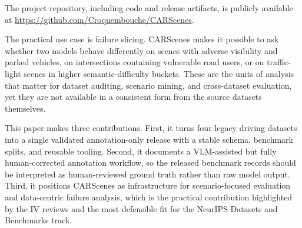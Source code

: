 The project repository, including code and release artifacts, is publicly available at \url{https://github.com/Croquembouche/CARScenes}.

The practical use case is failure slicing. CARScenes makes it possible to ask whether two models behave differently on scenes with adverse visibility and parked vehicles, on intersections containing vulnerable road users, or on traffic-light scenes in higher semantic-difficulty buckets. These are the units of analysis that matter for dataset auditing, scenario mining, and cross-dataset evaluation, yet they are not available in a consistent form from the source datasets themselves.

This paper makes three contributions. First, it turns four legacy driving datasets into a single validated annotation-only release with a stable schema, benchmark splits, and reusable tooling. Second, it documents a VLM-assisted but fully human-corrected annotation workflow, so the released benchmark records should be interpreted as human-reviewed ground truth rather than raw model output. Third, it positions CARScenes as infrastructure for scenario-focused evaluation and data-centric failure analysis, which is the practical contribution highlighted by the IV reviews and the most defensible fit for the NeurIPS Datasets and Benchmarks track.
